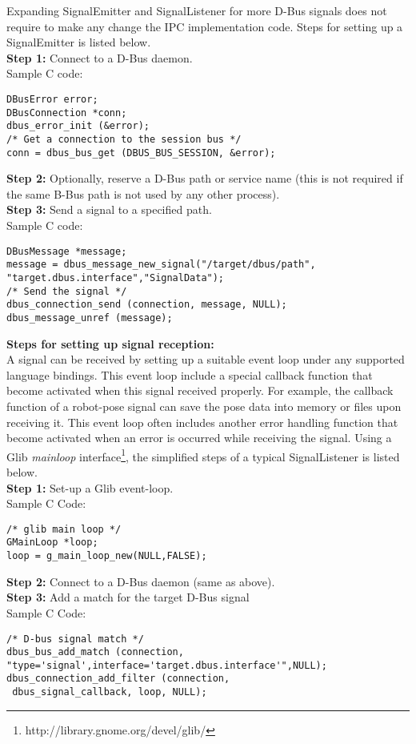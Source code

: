 Expanding SignalEmitter and SignalListener for more D-Bus signals does not require to make any change the IPC implementation code. Steps for setting up a SignalEmitter is listed below.\\
\textbf{Step 1:} Connect to a D-Bus daemon. \\
Sample C code:
\lstset{language=C,basicstyle=\small}
\begin{lstlisting}
DBusError error;
DBusConnection *conn;
dbus_error_init (&error);
/* Get a connection to the session bus */
conn = dbus_bus_get (DBUS_BUS_SESSION, &error);
\end{lstlisting}
\textbf{Step 2:} Optionally, reserve a D-Bus path or service name (this is not required if the same B-Bus path is not used by any other process).\\
\textbf{Step 3:} Send a signal to a specified path.\\
Sample C code:
\begin{lstlisting} 
DBusMessage *message;
message = dbus_message_new_signal("/target/dbus/path",
"target.dbus.interface","SignalData");
/* Send the signal */
dbus_connection_send (connection, message, NULL);
dbus_message_unref (message);
\end{lstlisting}
\textbf{Steps for setting up signal reception:}\\ 
A signal can be received by setting up a suitable event loop under any supported language bindings. This event loop include a special callback function that become activated when this signal received properly. For example, the callback function of a robot-pose signal can save the pose data into memory or files upon receiving it. This event loop often includes another error handling function that become activated when an error is occurred while receiving the signal. Using a Glib {\em mainloop} interface\footnote{http://library.gnome.org/devel/glib/}, the simplified steps of a typical SignalListener is listed below.\\
\textbf{Step 1:} Set-up a Glib event-loop.\\
Sample C Code:
\begin{lstlisting} 
/* glib main loop */
GMainLoop *loop;
loop = g_main_loop_new(NULL,FALSE);
\end{lstlisting} 
\textbf{Step 2:} Connect to a D-Bus daemon (same as above).\\
\textbf{Step 3:} Add a match for the target D-Bus signal\\
Sample C Code:
\begin{lstlisting} 
/* D-bus signal match */
dbus_bus_add_match (connection,
"type='signal',interface='target.dbus.interface'",NULL);
dbus_connection_add_filter (connection, 
 dbus_signal_callback, loop, NULL);
\end{lstlisting} 
